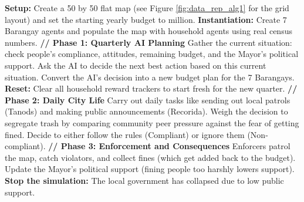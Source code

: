 \vspace{0.5cm} 
\begin{algorithm}[htbp]
\caption{The Coupled ABM-RL Main Simulation Loop (Plain English)}
\label{alg:main_loop_english}
\begin{algorithmic}[1]
\State \textbf{Setup:} Create a 50 by 50 flat map (see Figure \ref{fig:data_rep_alg1} for the grid layout) and set the starting yearly budget to  million.
\State \textbf{Instantiation:} Create 7 Barangay agents and populate the map with household agents using real census numbers.
    \State \textbf{// Phase 1: Quarterly AI Planning}
        \State Gather the current situation: check people's compliance, attitudes, remaining budget, and the Mayor's political support.
        \State Ask the AI to decide the next best action based on this current situation.
        \State Convert the AI's decision into a new budget plan for the 7 Barangays.
        \State \textbf{Reset:} Clear all household reward trackers to start fresh for the new quarter.
    \EndIf
    \State \textbf{// Phase 2: Daily City Life}
        \State Carry out daily tasks like sending out local patrols (Tanods) and making public announcements (Recorida).
    \EndFor
        \State Weigh the decision to segregate trash by comparing community peer pressure against the fear of getting fined.
        \State Decide to either follow the rules (Compliant) or ignore them (Non-compliant).
    \EndFor
    \State \textbf{// Phase 3: Enforcement and Consequences}
    \State Enforcers patrol the map, catch violators, and collect fines (which get added back to the budget).
    \State Update the Mayor's political support (fining people too harshly lowers support).
        \State \textbf{Stop the simulation:} The local government has collapsed due to low public support.
    \EndIf
\EndFor
\end{algorithmic}
\end{algorithm}